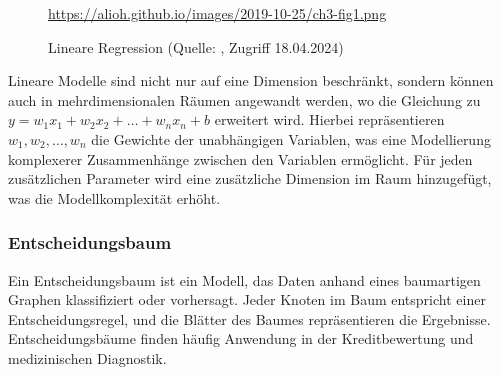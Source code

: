\begin{figure}[H]
	\centering
	\urldef{\myurl}\url{https://alioh.github.io/images/2019-10-25/ch3-fig1.png}
	\caption[Lineare Regression]{Lineare Regression (Quelle: \protect\myurl{}, Zugriff 18.04.2024)}
	\label{fig: Lineare Regression}
\end{figure}

Lineare Modelle sind nicht nur auf eine Dimension beschränkt, sondern können auch in mehrdimensionalen Räumen angewandt werden, wo die Gleichung zu \(y = w_1x_1 + w_2x_2 + \ldots + w_nx_n + b\) erweitert wird. Hierbei repräsentieren \(w_1, w_2, \ldots, w_n\) die Gewichte der unabhängigen Variablen, was eine Modellierung komplexerer Zusammenhänge zwischen den Variablen ermöglicht. Für jeden zusätzlichen Parameter wird eine zusätzliche Dimension im Raum hinzugefügt, was die Modellkomplexität erhöht.

\subsubsection{Entscheidungsbaum}\label{sec: Decision Tree}
Ein Entscheidungsbaum ist ein Modell, das Daten anhand eines baumartigen Graphen klassifiziert oder vorhersagt. Jeder Knoten im Baum entspricht einer Entscheidungsregel, und die Blätter des Baumes repräsentieren die Ergebnisse. Entscheidungsbäume finden häufig Anwendung in der Kreditbewertung und medizinischen Diagnostik.

